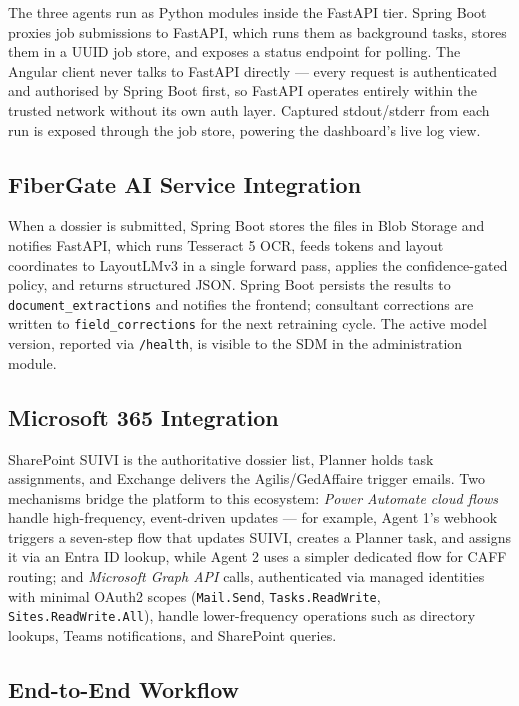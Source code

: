 The three agents run as Python modules inside the FastAPI tier. Spring Boot proxies job submissions to FastAPI, which runs them as background tasks, stores them in a UUID job store, and exposes a status endpoint for polling. The Angular client never talks to FastAPI directly — every request is authenticated and authorised by Spring Boot first, so FastAPI operates entirely within the trusted network without its own auth layer. Captured stdout/stderr from each run is exposed through the job store, powering the dashboard's live log view.

\subsection{FiberGate AI Service Integration}

When a dossier is submitted, Spring Boot stores the files in Blob Storage and notifies FastAPI, which runs Tesseract 5 OCR, feeds tokens and layout coordinates to LayoutLMv3 in a single forward pass, applies the confidence-gated policy, and returns structured JSON. Spring Boot persists the results to \texttt{document\_extractions} and notifies the frontend; consultant corrections are written to \texttt{field\_corrections} for the next retraining cycle. The active model version, reported via \texttt{/health}, is visible to the SDM in the administration module.

\subsection{Microsoft 365 Integration}

SharePoint SUIVI is the authoritative dossier list, Planner holds task assignments, and Exchange delivers the Agilis/GedAffaire trigger emails. Two mechanisms bridge the platform to this ecosystem: \emph{Power Automate cloud flows} handle high-frequency, event-driven updates — for example, Agent 1's webhook triggers a seven-step flow that updates SUIVI, creates a Planner task, and assigns it via an Entra ID lookup, while Agent 2 uses a simpler dedicated flow for CAFF routing; and \emph{Microsoft Graph API} calls, authenticated via managed identities with minimal OAuth2 scopes (\texttt{Mail.Send}, \texttt{Tasks.ReadWrite}, \texttt{Sites.ReadWrite.All}), handle lower-frequency operations such as directory lookups, Teams notifications, and SharePoint queries.

\subsection{End-to-End Workflow}

